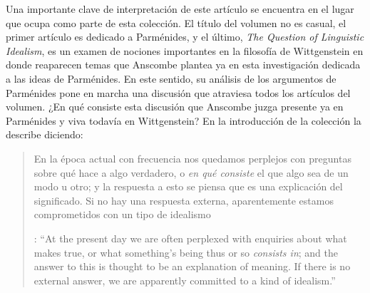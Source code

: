 Una importante clave de interpretación de este artículo se encuentra en el lugar que ocupa como parte de esta colección. El título del volumen no es casual, el primer artículo es dedicado a Parménides, y el último, \emph{The Question of Linguistic Idealism}, es un examen de nociones importantes en la filosofía de Wittgenstein en donde reaparecen temas que Anscombe plantea ya en esta investigación dedicada a las ideas de Parménides. En este sentido, su análisis de los argumentos de Parménides pone en marcha una discusión que atraviesa todos los artículos del volumen. ¿En qué consiste esta discusión que Anscombe juzga presente ya en Parménides y viva todavía en Wittgenstein? En la introducción de la colección la describe diciendo: \blockquote[{\cite[xi]{anscombe1981parmenides}}: \enquote{At the present day we are often perplexed with enquiries about what makes true, or what something's being thus or so \emph{consists in}; and the answer to this is thought to be an explanation of meaning. If there is no external answer, we are apparently committed to a kind of idealism.}]{En la época actual con frecuencia nos quedamos perplejos con preguntas sobre qué hace a algo verdadero, o \emph{en qué consiste} el que algo sea de un modo u otro; y la respuesta a esto se piensa que es una explicación del significado. Si no hay una respuesta externa, aparentemente estamos comprometidos con un tipo de idealismo}.\label{subsec:intextq}

